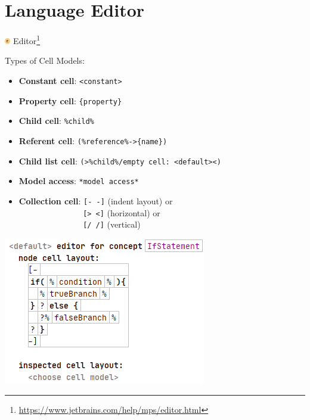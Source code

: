 	\section{Language Editor}

	\begin{frame}{\includegraphics[height=0.25cm]{graphics/editor.png}  Editor\footnote{\url{https://www.jetbrains.com/help/mps/editor.html}}}
		\begin{minipage}{0.52\textwidth}
			Types of Cell Models:
			\begin{itemize}
				\item \textbf{Constant cell}: \texttt{<constant>}
				\item \textbf{Property cell}: \texttt{\{property\}}
				\item \textbf{Child cell}: \texttt{\%child\%}
				\item \textbf{Referent cell}: \texttt{(\%reference\%->\{name\})}
				\item \textbf{Child list cell}: \texttt{(>\%child\%/empty cell: <default><)}
				\item \textbf{Model access}: \texttt{*model access*}
				\item \textbf{Collection cell}: \texttt{[- -]} (indent layout) or \\
				\textcolor{white}{Collection cell: n} \texttt{[> <]} (horizontal) or \\
				\textcolor{white}{Collection cell: n} \texttt{[/ /]} (vertical) 
			\end{itemize}
		\end{minipage}
		\begin{minipage}{0.4\textwidth}
			\includegraphics[height=0.8\textheight]{illustrations/editor.png}
		\end{minipage}
	\end{frame}

